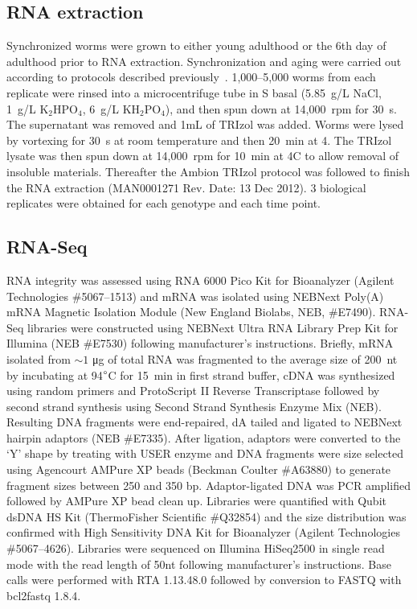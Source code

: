 \documentclass[9pt,twocolumn,twoside]{gsag3jnl}
\begin{document}
\subsection*{RNA extraction}
\label{sb:rna_extraction}
Synchronized worms were grown to either young adulthood or the 6th day of
adulthood prior to RNA extraction. Synchronization and aging were carried out
according to protocols described previously~\citep{Leighton2014}. 1,000--5,000
worms from each replicate were rinsed into a microcentrifuge tube in S basal
(5.85~g/L NaCl, 1~g/L $\mathrm{K}_2\mathrm{HPO}_4$, 6~g/L
$\mathrm{KH}_2\mathrm{PO}_4$), and then spun down at 14,000~rpm for 30~s. The
supernatant was removed and 1mL of TRIzol was added. Worms were lysed by
vortexing for 30~s at room temperature and then 20~min at 4\degree. The TRIzol
lysate was then spun down at 14,000~rpm for 10~min at 4\degree{}C to allow
removal of insoluble materials. Thereafter the Ambion TRIzol protocol was
followed to finish the RNA extraction (MAN0001271 Rev. Date: 13 Dec 2012).
3 biological replicates were obtained for each genotype and each time point.

\subsection*{RNA-Seq}
\label{sb:rna_seq}
RNA integrity was assessed using RNA 6000 Pico Kit for Bioanalyzer (Agilent
Technologies \#5067--1513) and mRNA was isolated using NEBNext Poly(A) mRNA
Magnetic Isolation Module (New England Biolabs, NEB, \#E7490). RNA-Seq libraries
were constructed using NEBNext Ultra RNA Library Prep Kit for Illumina (NEB
\#E7530) following manufacturer’s instructions. Briefly, mRNA isolated from
$\sim1$ \si{\micro\gram} of total RNA was fragmented to the average size of
200~nt by incubating at 94$\degree$C for 15~min in first strand buffer, cDNA was
synthesized using random primers and ProtoScript II Reverse Transcriptase
followed by second strand synthesis using Second Strand Synthesis Enzyme Mix
(NEB). Resulting DNA fragments were end-repaired, dA tailed and ligated to
NEBNext hairpin adaptors (NEB \#E7335). After ligation, adaptors were converted
to the ‘Y’ shape by treating with USER enzyme and DNA fragments were size
selected using Agencourt AMPure XP beads (Beckman Coulter \#A63880) to generate
fragment sizes between 250 and 350 bp. Adaptor-ligated DNA was PCR amplified
followed by AMPure XP bead clean up. Libraries were quantified with Qubit dsDNA
HS Kit (ThermoFisher Scientific \#Q32854) and the size distribution was
confirmed with High Sensitivity DNA Kit for Bioanalyzer (Agilent Technologies
\#5067--4626). Libraries were sequenced on Illumina HiSeq2500 in single read
mode with the read length of 50nt following manufacturer's instructions. Base
calls were performed with RTA 1.13.48.0 followed by conversion to FASTQ with
bcl2fastq 1.8.4.
\end{document}
